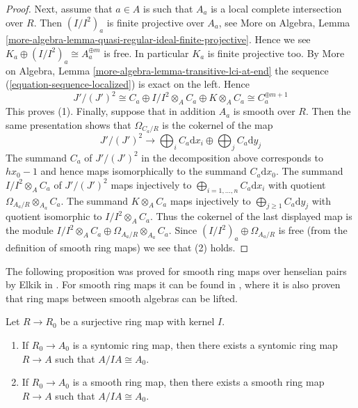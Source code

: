 \begin{proof}
\medskip\noindent
Next, assume that $a \in A$ is such that $A_a$ is a local complete
intersection over $R$. Then $(I/I^2)_a$ is finite projective over $A_a$, see
More on Algebra, Lemma
\ref{more-algebra-lemma-quasi-regular-ideal-finite-projective}.
Hence we see $K_a \oplus (I/I^2)_a \cong A_a^{\oplus m}$ is free.
In particular $K_a$ is finite projective too.
By More on Algebra, Lemma \ref{more-algebra-lemma-transitive-lci-at-end}
the sequence (\ref{equation-sequence-localized}) is exact on the left.
Hence
$$
J'/(J')^2 \cong
C_a \oplus I/I^2 \otimes_A C_a \oplus K \otimes_A C_a \cong
C_a^{\oplus m + 1}
$$
This proves (1). Finally, suppose that in addition $A_a$ is smooth over
$R$. Then the same presentation shows that $\Omega_{C_a/R}$
is the cokernel of the map
$$
J'/(J')^2 \longrightarrow
\bigoplus\nolimits_i C_a\text{d}x_i \oplus \bigoplus\nolimits_j C_a\text{d}y_j
$$
The summand $C_a$ of $J'/(J')^2$ in the decomposition above
corresponds to $hx_0 - 1$ and hence maps
isomorphically to the summand $C_a\text{d}x_0$. The summand
$I/I^2 \otimes_A C_a$ of $J'/(J')^2$ maps injectively to
$\bigoplus_{i = 1, \ldots, n} C_a\text{d}x_i$
with quotient $\Omega_{A_a/R} \otimes_{A_a} C_a$. The summand
$K \otimes_A C_a$ maps injectively to
$\bigoplus_{j \geq 1} C_a\text{d}y_j$ with quotient isomorphic to
$I/I^2 \otimes_A C_a$. Thus the cokernel of the last displayed
map is the module
$I/I^2 \otimes_A C_a \oplus \Omega_{A_a/R} \otimes_{A_a} C_a$.
Since $(I/I^2)_a \oplus \Omega_{A_a/R}$ is
free (from the definition of smooth ring maps) we see that (2) holds.
\end{proof}

\noindent
The following proposition was proved for smooth ring maps over henselian
pairs by Elkik in \cite{Elkik}. For smooth ring maps it can be found in
\cite{Arabia}, where it is also proven that ring maps between smooth
algebras can be lifted.

\begin{proposition}
\label{proposition-lift-smooth}
Let $R \to R_0$ be a surjective ring map with kernel $I$.
\begin{enumerate}
\item If $R_0 \to A_0$ is a syntomic ring map, then there exists a syntomic
ring map $R \to A$ such that $A/IA \cong A_0$.
\item If $R_0 \to A_0$ is a smooth ring map, then there exists a smooth
ring map $R \to A$ such that $A/IA \cong A_0$.
\end{enumerate}
\end{proposition}

